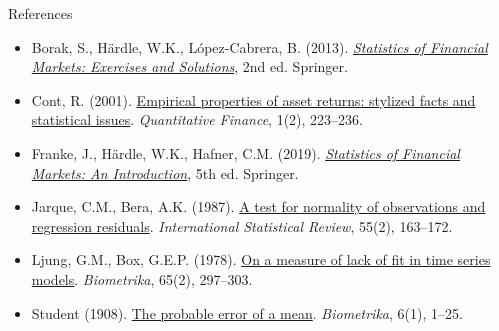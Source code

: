 \begin{frame}{References}
\itemsize{\tiny}
\begin{itemize}
    \item Borak, S., Härdle, W.K., López-Cabrera, B. (2013). \href{https://doi.org/10.1007/978-3-642-33929-5}{\textit{Statistics of Financial Markets: Exercises and Solutions}}, 2nd ed. Springer.
    \item Cont, R. (2001). \href{https://doi.org/10.1080/713665670}{Empirical properties of asset returns: stylized facts and statistical issues}. \textit{Quantitative Finance}, 1(2), 223--236.
    \item Franke, J., Härdle, W.K., Hafner, C.M. (2019). \href{https://doi.org/10.1007/978-3-030-13751-9}{\textit{Statistics of Financial Markets: An Introduction}}, 5th ed. Springer.
    \item Jarque, C.M., Bera, A.K. (1987). \href{https://doi.org/10.2307/1403192}{A test for normality of observations and regression residuals}. \textit{International Statistical Review}, 55(2), 163--172.
    \item Ljung, G.M., Box, G.E.P. (1978). \href{https://doi.org/10.1093/biomet/65.2.297}{On a measure of lack of fit in time series models}. \textit{Biometrika}, 65(2), 297--303.
    \item Student (1908). \href{https://doi.org/10.1093/biomet/6.1.1}{The probable error of a mean}. \textit{Biometrika}, 6(1), 1--25.
\end{itemize}
\end{frame}


